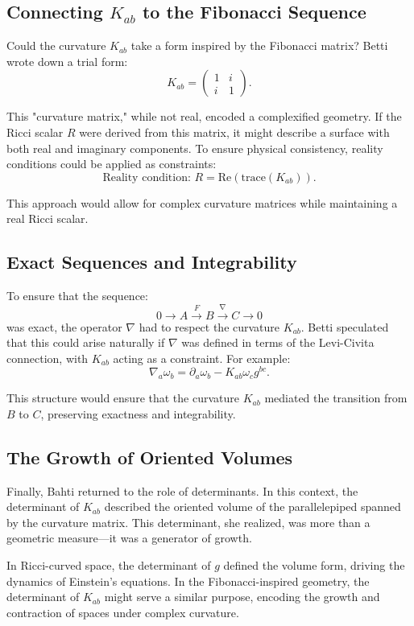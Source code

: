 \subsection*{Connecting \(K_{ab}\) to the Fibonacci Sequence}

Could the curvature \(K_{ab}\) take a form inspired by the Fibonacci matrix? Betti wrote down a trial form:
\[
K_{ab} = \begin{pmatrix} 1 & i \\ i & 1 \end{pmatrix}.
\]

This "curvature matrix," while not real, encoded a complexified geometry. If the Ricci scalar \(R\) were derived from this matrix, it might describe a surface with both real and imaginary components. To ensure physical consistency, reality conditions could be applied as constraints:
\[
\text{Reality condition: } R = \text{Re}(\text{trace}(K_{ab})).
\]

This approach would allow for complex curvature matrices while maintaining a real Ricci scalar.

\subsection*{Exact Sequences and Integrability}

To ensure that the sequence:
\[
0 \to A \xrightarrow{F} B \xrightarrow{\nabla} C \to 0
\]
was exact, the operator \(\nabla\) had to respect the curvature \(K_{ab}\). Betti speculated that this could arise naturally if \(\nabla\) was defined in terms of the Levi-Civita connection, with \(K_{ab}\) acting as a constraint. For example:
\[
\nabla_a \omega_b = \partial_a \omega_b - K_{ab} \omega_c g^{bc}.
\]

This structure would ensure that the curvature \(K_{ab}\) mediated the transition from \(B\) to \(C\), preserving exactness and integrability.


\subsection*{The Growth of Oriented Volumes}

Finally, Bahti returned to the role of determinants. In this context, the determinant of \(K_{ab}\) described the oriented volume of the parallelepiped spanned by the curvature matrix. This determinant, she realized, was more than a geometric measure—it was a generator of growth.

In Ricci-curved space, the determinant of \(g\) defined the volume form, driving the dynamics of Einstein's equations. In the Fibonacci-inspired geometry, the determinant of \(K_{ab}\) might serve a similar purpose, encoding the growth and contraction of spaces under complex curvature.

